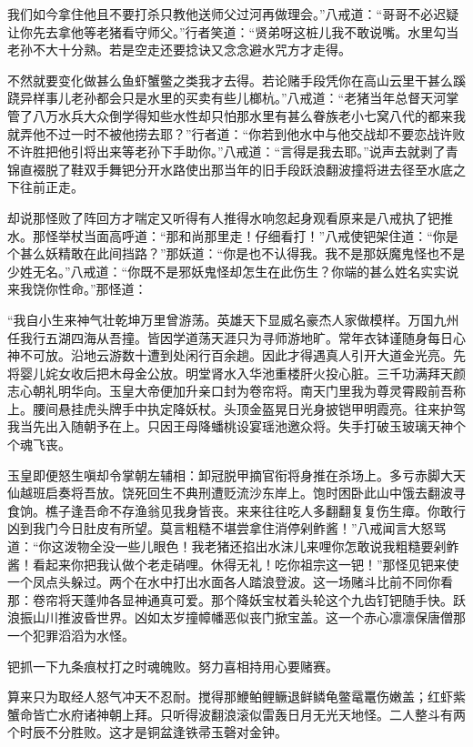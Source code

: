 \documentclass[12pt,UTF8]{ctexbook}
\begin{document}
我们如今拿住他且不要打杀只教他送师父过河再做理会。”八戒道：“哥哥不必迟疑让你先去拿他等老猪看守师父。”行者笑道：“贤弟呀这桩儿我不敢说嘴。水里勾当老孙不大十分熟。若是空走还要捻诀又念念避水咒方才走得。

不然就要变化做甚么鱼虾蟹鳖之类我才去得。若论赌手段凭你在高山云里干甚么蹊跷异样事儿老孙都会只是水里的买卖有些儿榔杭。”八戒道：“老猪当年总督天河掌管了八万水兵大众倒学得知些水性却只怕那水里有甚么眷族老小七窝八代的都来我就弄他不过一时不被他捞去耶？”行者道：“你若到他水中与他交战却不要恋战许败不许胜把他引将出来等老孙下手助你。”八戒道：“言得是我去耶。”说声去就剥了青锦直裰脱了鞋双手舞钯分开水路使出那当年的旧手段跃浪翻波撞将进去径至水底之下往前正走。

却说那怪败了阵回方才喘定又听得有人推得水响忽起身观看原来是八戒执了钯推水。那怪举杖当面高呼道：“那和尚那里走！仔细看打！”八戒使钯架住道：“你是个甚么妖精敢在此间挡路？”那妖道：“你是也不认得我。我不是那妖魔鬼怪也不是少姓无名。”八戒道：“你既不是邪妖鬼怪却怎生在此伤生？你端的甚么姓名实实说来我饶你性命。”那怪道：

“我自小生来神气壮乾坤万里曾游荡。英雄天下显威名豪杰人家做模样。万国九州任我行五湖四海从吾撞。皆因学道荡天涯只为寻师游地旷。常年衣钵谨随身每日心神不可放。沿地云游数十遭到处闲行百余趟。因此才得遇真人引开大道金光亮。先将婴儿姹女收后把木母金公放。明堂肾水入华池重楼肝火投心脏。三千功满拜天颜志心朝礼明华向。玉皇大帝便加升亲口封为卷帘将。南天门里我为尊灵霄殿前吾称上。腰间悬挂虎头牌手中执定降妖杖。头顶金盔晃日光身披铠甲明霞亮。往来护驾我当先出入随朝予在上。只因王母降蟠桃设宴瑶池邀众将。失手打破玉玻璃天神个个魂飞丧。

玉皇即便怒生嗔却令掌朝左辅相：卸冠脱甲摘官衔将身推在杀场上。多亏赤脚大天仙越班启奏将吾放。饶死回生不典刑遭贬流沙东岸上。饱时困卧此山中饿去翻波寻食饷。樵子逢吾命不存渔翁见我身皆丧。来来往往吃人多翻翻复复伤生瘴。你敢行凶到我门今日肚皮有所望。莫言粗糙不堪尝拿住消停剁鲊酱！”八戒闻言大怒骂道：“你这泼物全没一些儿眼色！我老猪还掐出水沫儿来哩你怎敢说我粗糙要剁鲊酱！看起来你把我认做个老走硝哩。休得无礼！吃你祖宗这一钯！”那怪见钯来使一个凤点头躲过。两个在水中打出水面各人踏浪登波。这一场赌斗比前不同你看那：卷帘将天蓬帅各显神通真可爱。那个降妖宝杖着头轮这个九齿钉钯随手快。跃浪振山川推波昏世界。凶如太岁撞幛幡恶似丧门掀宝盖。这一个赤心凛凛保唐僧那一个犯罪滔滔为水怪。

钯抓一下九条痕杖打之时魂魄败。努力喜相持用心要赌赛。

算来只为取经人怒气冲天不忍耐。搅得那鯾鲌鲤鳜退鲜鳞龟鳖鼋鼍伤嫩盖；红虾紫蟹命皆亡水府诸神朝上拜。只听得波翻浪滚似雷轰日月无光天地怪。二人整斗有两个时辰不分胜败。这才是铜盆逢铁帚玉磬对金钟。
\end{document}
